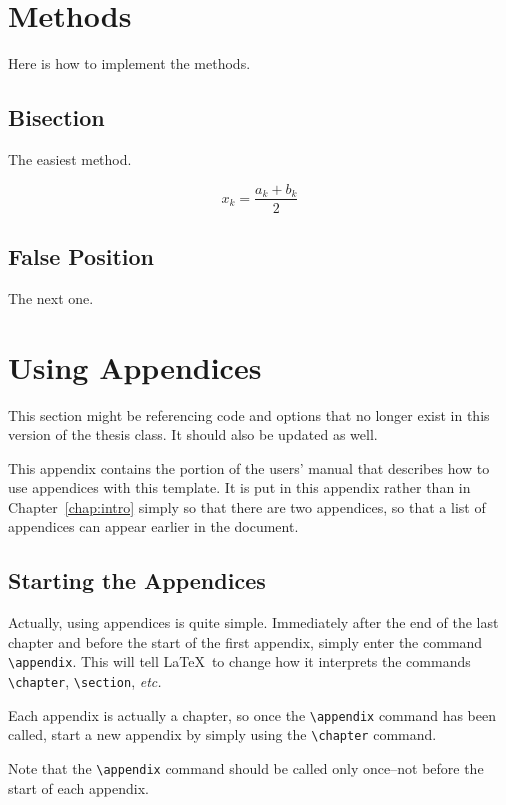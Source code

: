 \appendix
\chapter{Methods}
Here is how to implement the methods.

\section{Bisection}
The easiest method.

\begin{equation}\label{eq:sum}
    x_k = \frac{a_k+b_k}{2}
\end{equation}

\section{False Position}
The next one.

\chapter{Using Appendices}    \label{app:appendix}

This section might be referencing code and options that no longer exist in this version of the thesis class.
It should also be updated as well.

This appendix contains the portion of the users' manual that describes
how to use appendices with this template.  It is put in this appendix
rather than in Chapter~\cref{chap:intro} simply so that there are two
appendices, so that a list of appendices can appear earlier in the
document.

\section{Starting the Appendices}
Actually, using appendices is quite simple.  Immediately after the end
of the last chapter and before the start of the first appendix, simply
enter the command \verb|\appendix|.  This will tell \LaTeX~to change
how it interprets the commands \verb|\chapter|, \verb|\section|,
\textit{etc.}

Each appendix is actually a chapter, so once the \verb|\appendix|
command has been called, start a new appendix by simply using the
\verb|\chapter| command.

Note that the \verb|\appendix| command should be called only
once--not before the start of each appendix.

